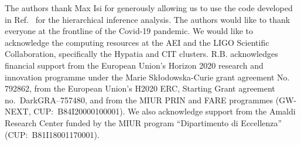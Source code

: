 The authors thank Max Isi for generously allowing us to use the code developed in Ref.~\cite{Isi:2019asy} for the hierarchical inference analysis. The authors would like to thank everyone at the frontline of the Covid-19 pandemic. We would like to acknowledge the computing resources at the AEI and the LIGO Scientific Collaboration, specifically the Hypatia and CIT clusters. R.B. acknowledges financial support from the European Union's Horizon 2020 research and innovation programme under the Marie Sk\l odowska-Curie grant agreement No. 792862, from the European Union's H2020 ERC, Starting Grant agreement no.~DarkGRA--757480, and from the MIUR PRIN and FARE programmes (GW-NEXT, CUP:~B84I20000100001). We also acknowledge support from the Amaldi Research Center funded by the MIUR program ``Dipartimento di Eccellenza'' (CUP:~B81I18001170001).